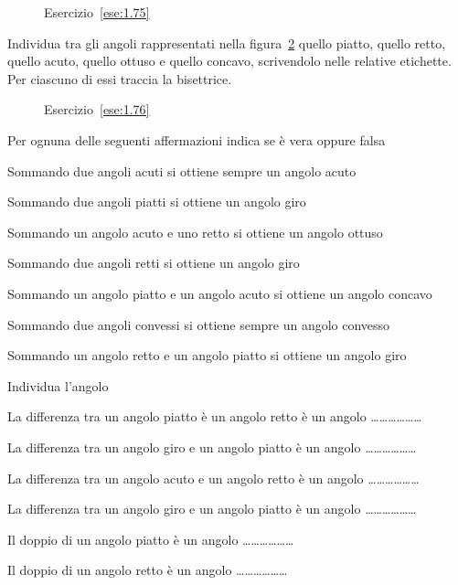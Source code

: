 \begin{figure}[htb]
 \centering
 \caption{Esercizio~\ref{ese:1.75}}\label{fig:ese1.75}
\end{figure}

\begin{esercizio}
\label{ese:1.76}
Individua tra gli angoli rappresentati nella figura~\ref{fig:ese1.76} quello piatto, quello retto, quello acuto, quello ottuso e quello concavo, scrivendolo nelle relative etichette. Per ciascuno di essi traccia la bisettrice.
\end{esercizio}

\begin{figure}[htb]
 \centering
 \caption{Esercizio~\ref{ese:1.76}}\label{fig:ese1.76}
\end{figure}

\begin{esercizio}
\label{ese:1.77}
Per ognuna delle seguenti affermazioni indica se è vera oppure falsa
\begin{enumeratea}
\item Sommando due angoli acuti si ottiene sempre un angolo acuto		\hfill\boxV\quad\boxF
\item Sommando due angoli piatti si ottiene un angolo giro				\hfill\boxV\quad\boxF
\item Sommando un angolo acuto e uno retto si ottiene un angolo ottuso	\hfill\boxV\quad\boxF
\item Sommando due angoli retti si ottiene un angolo giro				\hfill\boxV\quad\boxF
\item Sommando un angolo piatto e un angolo acuto si ottiene un angolo concavo	\hfill\boxV\quad\boxF
\item Sommando due angoli convessi si ottiene sempre un angolo convesso	\hfill\boxV\quad\boxF
\item Sommando un angolo retto e un angolo piatto si ottiene un angolo giro		\hfill\boxV\quad\boxF
\end{enumeratea}
\end{esercizio}

\begin{esercizio}
\label{ese:1.78}
Individua l'angolo
\begin{enumeratea}
\item La differenza tra un angolo piatto è un angolo retto è un angolo \ldots\ldots\ldots\ldots\ldots\ldots{}
\item La differenza tra un angolo giro e un angolo piatto è un angolo \ldots\ldots\ldots\ldots\ldots\ldots{}
\item La differenza tra un angolo acuto e un angolo retto è un angolo \ldots\ldots\ldots\ldots\ldots\ldots{}
\item La differenza tra un angolo giro e un angolo piatto è un angolo \ldots\ldots\ldots\ldots\ldots\ldots{}
\item Il doppio di un angolo piatto è un angolo \ldots\ldots\ldots\ldots\ldots\ldots{}
\item Il doppio di un angolo retto è un angolo \ldots\ldots\ldots\ldots\ldots\ldots{}
\end{enumeratea}
\end{esercizio}
	
